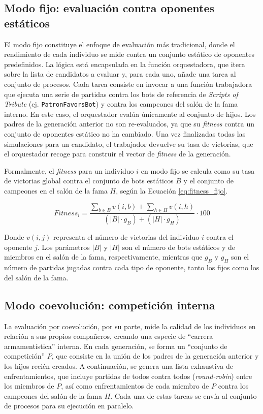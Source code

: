 \subsection{Modo fijo: evaluación contra oponentes estáticos} \label{sec:modo_fijo_evaluacion}

El modo fijo constituye el enfoque de evaluación más tradicional, donde el rendimiento de cada individuo se mide contra un conjunto estático de oponentes predefinidos. La lógica está encapsulada en la función orquestadora, que itera sobre la lista de candidatos a evaluar y, para cada uno, añade una tarea al conjunto de procesos. Cada tarea consiste en invocar a una función trabajadora que ejecuta una serie de partidas contra los bots de referencia de \textit{Scripts of Tribute} (ej. \texttt{PatronFavorsBot}) y contra los campeones del salón de la fama interno. En este caso, el orquestador evalúa únicamente al conjunto de hijos. Los padres de la generación anterior no son re-evaluados, ya que su \textit{fitness} contra un conjunto de oponentes estático no ha cambiado. Una vez finalizadas todas las simulaciones para un candidato, el trabajador devuelve su tasa de victorias, que el orquestador recoge para construir el vector de \textit{fitness} de la generación.

Formalmente, el \textit{fitness} para un individuo $i$ en modo fijo se calcula como su tasa de victorias global contra el conjunto de bots estáticos $B$ y el conjunto de campeones en el salón de la fama $H$, según la Ecuación \ref{eq:fitness_fijo}.

\begin{equation}
	\textit{Fitness}_{i} = \frac{\sum_{b \in B} v(i, b) + \sum_{h \in H} v(i, h)}{(|B| \cdot g_B) + (|H| \cdot g_H)} \cdot 100
	\label{eq:fitness_fijo}
\end{equation}

Donde $v(i, j)$ representa el número de victorias del individuo $i$ contra el oponente $j$. Los parámetros $|B|$ y $|H|$ son el número de bots estáticos y de miembros en el salón de la fama, respectivamente, mientras que $g_B$ y $g_H$ son el número de partidas jugadas contra cada tipo de oponente, tanto los fijos como los del salón de la fama.

\subsection{Modo coevolución: competición interna} \label{sec:modo_coevolucion_competicion}

La evaluación por coevolución, por su parte, mide la calidad de los individuos en relación a sus propios compañeros, creando una especie de ``carrera armamentística'' interna. En cada generación, se forma un ``conjunto de competición'' $P$, que consiste en la unión de los padres de la generación anterior y los hijos recién creados. A continuación, se genera una lista exhaustiva de enfrentamientos, que incluye partidas de todos contra todos (\textit{round-robin}) entre los miembros de $P$, así como enfrentamientos de cada miembro de $P$ contra los campeones del salón de la fama $H$. Cada una de estas tareas se envía al conjunto de procesos para su ejecución en paralelo.

